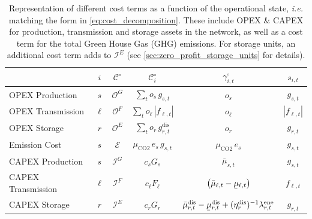 \documentclass[11pt,twocolumn]{article}
\newcommand{\ie}{\textit{i.e.} }
\newcommand{\ubar}[1]{\underaccent{\bar}{#1}}
\newcommand{\state}[1][i]{s_{#1,t}}
\newcommand{\costfactor}{\gamma^\circ_{i,t}}
\newcommand{\generation}{g_{s,t}}
\newcommand{\capacitygeneration}{G_{s}}
\newcommand{\operationalpricegeneration}{o_{s}}
\newcommand{\capitalpricegeneration}{c_{s}}
\newcommand{\muuppergeneration}{\bar{\mu}_{s,t}}
\newcommand{\flow}{f_{\ell,t}}
\newcommand{\capacityflow}{F_{\ell}}
\newcommand{\operationalpriceflow}{o_\ell}
\newcommand{\capitalpriceflow}{c_{\ell}}
\newcommand{\mulowerflow}{\ubar{\mu}_{\ell,t}}
\newcommand{\muupperflow}{\bar{\mu}_{\ell,t}}
\newcommand{\storage}{g_{r,t}}
\newcommand{\storagedispatch}{\storage^\text{dis}}
\newcommand{\efficiency}{\eta_{r}}
\newcommand{\efficiencydispatch}{\efficiency^\text{dis}}
\newcommand{\operationalpricestorage}{o_r}
\newcommand{\capitalpricestorage}{c_r}
\newcommand{\capacitystorage}{G_r}
\newcommand{\mulowerstoragedispatch}{\ubar{\mu}_{r,t}^\text{dis}}
\newcommand{\muupperstoragedispatch}{\bar{\mu}_{r,t}^\text{dis}}
\newcommand{\mustateofcharge}{\lambda^\text{ene}_{r,t}}
\newcommand{\emission}{e_{s}}
\newcommand{\emissionprice}{\mu_{\text{CO2}}}
\newcommand{\cost}[1][\circ]{\mathcal{C}^{#1}}
\newcommand{\opexgeneration}{\mathcal{O}^G}
\newcommand{\opexflow}{\mathcal{O}^F}
\newcommand{\opexstorage}{\mathcal{O}^E}
\newcommand{\capexgeneration}{\mathcal{I}^G}
\newcommand{\capexflow}{\mathcal{I}^F}
\newcommand{\capexstorage}{\mathcal{I}^E}
\newcommand{\emissioncost}{\mathcal{E}}
\begin{document}
\begin{table}[t]
    \begin{center}
        \begin{tabular}{l|c|c|c|c|c}
        & $i$ & $\cost$ & $\cost_i$  & $\costfactor$ & $\state$  \\
        \toprule 
        OPEX Production & $s$ & $\opexgeneration$ & $\sum_{t} \operationalpricegeneration \, \generation$   & $\operationalpricegeneration$ & $\generation$ \\  
        OPEX Transmission  & $\ell$ & $\opexflow$ & $\sum_{t} \operationalpriceflow \, |\flow|  $ & $\operationalpriceflow$ & $|\flow|$ \\  
        OPEX Storage & $r$  & $\opexstorage$ & $\sum_{t} \operationalpricestorage \, \storagedispatch$ &  $\operationalpricestorage$ & $\storage$ \\
        \midrule
        Emission Cost & $s$ & $\emissioncost$ & $ \emissionprice \, \emission \, \generation$ & $\emissionprice \,\emission$ & $\generation$ \\
        \midrule   
        CAPEX Production & $s$ & $\capexgeneration$ & $ \capitalpricegeneration \capacitygeneration$ & $\muuppergeneration$ & $\generation$ \\
        CAPEX Transmission & $\ell$ & $\capexflow$ & $ \capitalpriceflow \capacityflow$ & $\left(\muupperflow - \mulowerflow \right)$ & $\flow$ \\
        CAPEX Storage & $r$ & $\capexstorage$ & $ \capitalpricestorage \capacitystorage$ & $ \muupperstoragedispatch - \mulowerstoragedispatch  + (\efficiencydispatch )^{-1} \mustateofcharge $ & $\storage$ \\
    \end{tabular}
    \end{center}
    \caption{Representation of different cost terms as a function of the operational state, \ie matching the form in \cref{eq:cost_decomposition}. These include OPEX \& CAPEX for production, transmission and storage assets in the network, as well as a cost term for the total Green House Gas (GHG) emissions. For storage units, an additional cost term adds to $\capexstorage$ (see \cref{sec:zero_profit_storage_units} for details).}
    \label{tab:cost_allocation_map}
\end{table}
\end{document}

